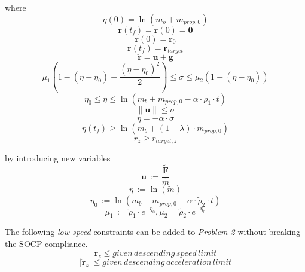 \documentclass[10pt]{elsarticle}
\begin{document}
where 
\small
\begin{equation}
\eta(0) = \ln(m_b + m_{prop,0})
\end{equation}
\begin{equation}
\dot{\boldsymbol{r}}(t_f) = \dot{\boldsymbol{r}}(0) = \boldsymbol{0}
\end{equation}
\begin{equation}
\boldsymbol{r}(0) = \boldsymbol{r}_0
\end{equation}
\begin{equation}
\boldsymbol{r}(t_f) = \boldsymbol{r}_{target}
\end{equation}
\begin{equation}
\ddot{\boldsymbol{r}} = \boldsymbol{u} + \boldsymbol{g}
\end{equation}
\begin{equation} 
\mu_1 (1-(\eta-\eta_0)+\frac{(\eta-\eta_0)^2}{2}) \le \sigma \le \mu_2 (1-(\eta-\eta_0)) 
\end{equation}
\begin{equation}
\eta_0 \le \eta \le \ln(m_b + m_{prop,0} - \alpha \cdot \tilde{\rho}_1 \cdot t)
\end{equation}
\begin{equation} \|\boldsymbol{u}\| \le \sigma \end{equation}
\begin{equation} \dot{\eta} = -\alpha \cdot \sigma \end{equation}
\begin{equation}
\eta(t_f) \ge \ln(m_b + (1 - \lambda) \cdot m_{prop,0})
\end{equation}
\begin{equation} 
r_z \ge r_{target,z}
\end{equation}
\normalsize

by introducing new variables
\[
\boldsymbol{u} \, := \frac{\tilde{\boldsymbol{F}}}{\tilde{m}}
\]
\[
\eta \, := \ln(\tilde{m})
\]
\[
\eta_0 \, := \ln(m_b + m_{prop,0} - \alpha \cdot \tilde{\rho}_2 \cdot t)
\]
\[
\mu_1 \, := \tilde{\rho}_1 \cdot e^{-\eta_0}, \mu_2 = \tilde{\rho}_2 \cdot e^{-\eta_0}
\]

The following \textit{low speed} constraints can be added to \textit{Problem 2} without breaking the SOCP compliance.  
\begin{equation} 
\dot{\boldsymbol{r}}_z \le given \, descending \, speed \, limit
\end{equation}
\begin{equation} 
|\ddot{\boldsymbol{r}}_z| \le given \, descending \, acceleration \, limit
\end{equation}
\end{document}
